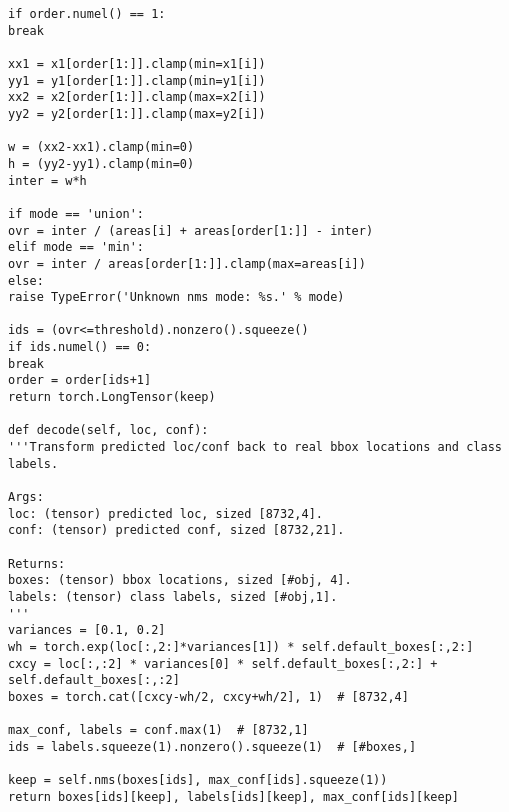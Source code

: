 \begin{lstlisting}
if order.numel() == 1:
break

xx1 = x1[order[1:]].clamp(min=x1[i])
yy1 = y1[order[1:]].clamp(min=y1[i])
xx2 = x2[order[1:]].clamp(max=x2[i])
yy2 = y2[order[1:]].clamp(max=y2[i])

w = (xx2-xx1).clamp(min=0)
h = (yy2-yy1).clamp(min=0)
inter = w*h

if mode == 'union':
ovr = inter / (areas[i] + areas[order[1:]] - inter)
elif mode == 'min':
ovr = inter / areas[order[1:]].clamp(max=areas[i])
else:
raise TypeError('Unknown nms mode: %s.' % mode)

ids = (ovr<=threshold).nonzero().squeeze()
if ids.numel() == 0:
break
order = order[ids+1]
return torch.LongTensor(keep)

def decode(self, loc, conf):
'''Transform predicted loc/conf back to real bbox locations and class labels.

Args:
loc: (tensor) predicted loc, sized [8732,4].
conf: (tensor) predicted conf, sized [8732,21].

Returns:
boxes: (tensor) bbox locations, sized [#obj, 4].
labels: (tensor) class labels, sized [#obj,1].
'''
variances = [0.1, 0.2]
wh = torch.exp(loc[:,2:]*variances[1]) * self.default_boxes[:,2:]
cxcy = loc[:,:2] * variances[0] * self.default_boxes[:,2:] + self.default_boxes[:,:2]
boxes = torch.cat([cxcy-wh/2, cxcy+wh/2], 1)  # [8732,4]

max_conf, labels = conf.max(1)  # [8732,1]
ids = labels.squeeze(1).nonzero().squeeze(1)  # [#boxes,]

keep = self.nms(boxes[ids], max_conf[ids].squeeze(1))
return boxes[ids][keep], labels[ids][keep], max_conf[ids][keep]
\end{lstlisting}

